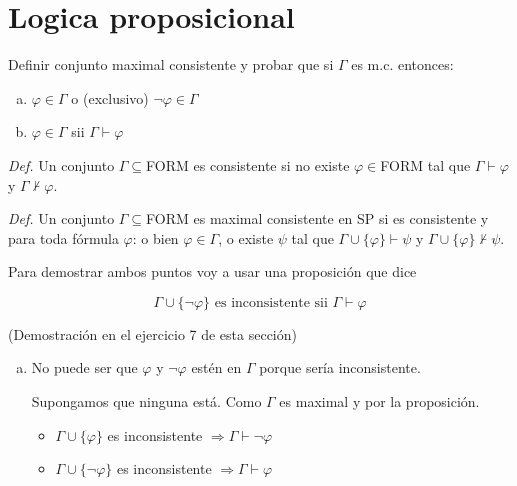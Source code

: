 \section{Logica proposicional}

\begin{questions}

\question Definir conjunto maximal consistente y probar que si $\Gamma$ es m.c. entonces: 

\begin{enumerate}[a)]
 \item $\varphi\in\Gamma$ o (exclusivo) $\neg\varphi\in\Gamma$
 \item $\varphi\in\Gamma$ sii $\Gamma\vdash\varphi$
\end{enumerate}


\begin{solution}

 {\it Def. } Un conjunto $\Gamma\subseteq$FORM es consistente si no existe $\varphi\in$FORM tal que $\Gamma\vdash\varphi$ y $\Gamma\nvdash\varphi$.
 
 {\it Def. } Un conjunto $\Gamma\subseteq$FORM es maximal consistente en SP si es consistente y para toda f\'ormula $\varphi$: o bien $\varphi\in\Gamma$, o existe $\psi$ tal que $\Gamma\cup\{\varphi\}\vdash\psi$ y $\Gamma\cup\{\varphi\}\nvdash\psi$.
  
 Para demostrar ambos puntos voy a usar una proposici\'on que dice 
 
 \begin{equation*}
  \Gamma\cup\{\neg\varphi\} \text{ es inconsistente sii } \Gamma\vdash\varphi
 \end{equation*}
 
 (Demostraci\'on en el ejercicio 7 de esta secci\'on)
 
 \begin{enumerate}[a)]
  \item No puede ser que $\varphi$ y $\neg\varphi$ est\'en en $\Gamma$ porque  ser\'ia inconsistente.
  
  Supongamos que ninguna est\'a. Como $\Gamma$ es maximal y por la proposici\'on.
  
  \begin{itemize}
   \item $\Gamma\cup\{\varphi\}$ es inconsistente $\Rightarrow \Gamma\vdash\neg\varphi$
   \item $\Gamma\cup\{\neg\varphi\}$ es inconsistente $\Rightarrow \Gamma\vdash\varphi$
  \end{itemize}


\end{enumerate}
\end{solution}
\end{questions}
